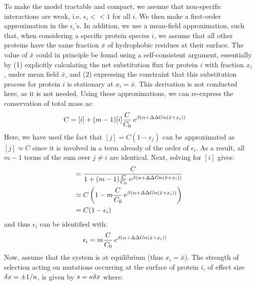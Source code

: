 To make the model tractable and compact, we assume that non-specific interactions are weak, i.e. $\epsilon_i << 1$ for all $i$. We then make a first-order approximation in the $\epsilon_i$'s.
In addition, we use a mean-field approximation, such that, when considering a specific protein species $i$, we assume that all other proteins have the same fraction $\bar x$ of hydrophobic residues at their surface.
The value of $\bar x$ could in principle be found using a self-consistent argument, essentially by (1) explicitly calculating the net substitution flux for protein $i$ with fraction $x_i$, under mean field $\bar x$, and (2) expressing the constraint that this substitution process for protein $i$ is stationary at $x_i = \bar x$.
This derivation is not conducted here, as it is not needed.
Using these approximations, we can re-express the conservation of total mass as:
\begin{align}
C & = [i] + (m-1) [i] \frac{C}{C_0} \, e^{\beta (\alpha + \Delta \Delta G n (\bar x + x_i))}
\end{align}
Here, we have used the fact that $[j] = C(1 - \epsilon_j)$ can be approximated as $[j] \simeq C$ since it is involved in a term already of the order of $\epsilon_i$. As a result, all $m-1$ terms of the sum over $j\neq i$ are identical.
Next, solving for $[i]$ gives:
\begin{align}
[i] & = \frac{C} {1 + (m-1) \frac{C}{C_0} \, e^{\beta (\DeltaGmin + \DeltaDeltaG \NbrSites (\bar x + x_i))}}
\\ & \simeq C \left( 1 - m \frac{C}{C_0} \, e^{\beta (\DeltaGmin + \DeltaDeltaG \NbrSites (\bar x + x_i))} \right)
\\ & =
C (1 - \epsilon_i)
\end{align}
and thus $\epsilon_i$ can be identified with:
\begin{align}
\epsilon_i  & = m \frac{C}{C_0} \, e^{\beta (\alpha +\Delta \Delta G n (\bar x + x_i))}
\end{align}
Now, assume that the system is at equilibrium (thus $x_i = \bar x$).
The strength of selection acting on mutations occurring at the surface of protein $i$, of effect size $\delta x = \pm 1/n$, is given by $s = \kappa \delta x$ where:

